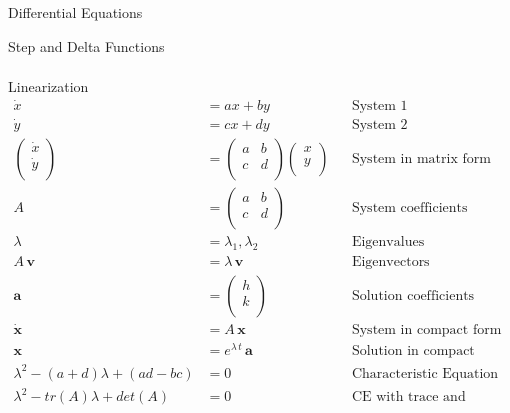 \begin{section}{Differential Equations}
\begin{subsection}{Step and Delta Functions}
\begin{align*}
    \end{align*}
  \end{subsection}
  \begin{subsection}{Linearization}
    \begin{align*}
      \dot{x} &= ax + by && \text{System 1}\\
      \dot{y} &= cx + dy && \text{System 2}\\
      \begin{pmatrix}
        \dot{x} \\
        \dot{y} \\
      \end{pmatrix}
      &=
      \begin{pmatrix}
        a & b \\
        c & d \\
      \end{pmatrix}
      \begin{pmatrix}
        x \\
        y \\
      \end{pmatrix}
      && \text{System in matrix form}\\
      A &=
      \begin{pmatrix}
        a & b \\
        c & d \\
      \end{pmatrix}
      && \text{System coefficients}\\
      \lambda &= \lambda_1 , \lambda_2 && \text{Eigenvalues}\\
      A\,\mathbf{v} &= \lambda\,\mathbf{v} &&  \text{Eigenvectors}\\
      \mathbf{a} &=
      \begin{pmatrix}
        h \\
        k \\
      \end{pmatrix}
      && \text{Solution coefficients}\\
     \dot{\mathbf{x}} &= A\,\mathbf{x} && \text{System in compact form} \\
     \mathbf{x} &= e^{\lambda\,t}\,\mathbf{a}
     && \text{Solution in compact form} \\
     \lambda^2 - (a+d)\lambda + (ad - bc) &= 0
     && \text{Characteristic Equation (CE)} \\
     \lambda^2 - tr(A)\lambda + det(A) &= 0
     && \text{CE with trace and determinant} \\
    \end{align*}
  \end{subsection}
\end{section}
